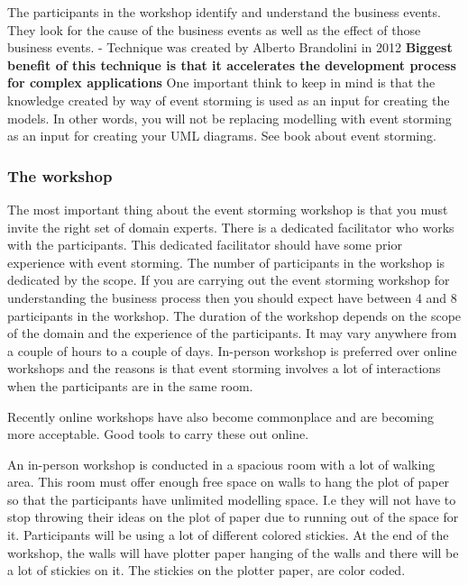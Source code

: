 \documentclass[a4paper, 11pt]{book}
\begin{document}
    The participants in the workshop identify and understand the business events.
    They look for the cause of the business events as well as the effect of those business events.
    - Technique was created by Alberto Brandolini in 2012 %
    \textbf{Biggest benefit of this technique is that it accelerates the development process for complex applications}
    One important think to keep in mind is that the knowledge created by way of event storming is used as an input for creating the models.
    In other words, you will not be replacing modelling with event storming as an input for creating your UML diagrams. See book about event storming.

    \subsubsection{The workshop}
    The most important thing about the event storming workshop is that you must invite the right set of domain experts.
    There is a dedicated facilitator who works with the participants.
    This dedicated facilitator should have some prior experience with event storming.
    The number of participants in the workshop is dedicated by the scope.
    If you are carrying out the event storming workshop for understanding the business process then you should expect have between 4 and 8 participants in the workshop.
    The duration of the workshop depends on the scope of the domain and the experience of the participants.
    It may vary anywhere from a couple of hours to a couple of days.
    In-person workshop is preferred over online workshops and the reasons is that event storming involves a lot of interactions when the participants are in the same room.

    Recently online workshops have also become commonplace and are becoming more acceptable.
    Good tools to carry these out online.

    An in-person workshop is conducted in a spacious room with a lot of walking area.
    This room must offer enough free space on walls to hang the plot of paper so that the participants have unlimited modelling space.
    I.e they will not have to stop throwing their ideas on the plot of paper due to running out of the space for it.
    Participants will be using a lot of different colored stickies.
    At the end of the workshop, the walls will have plotter paper hanging of the walls and there will be a lot of stickies on it.
    The stickies on the plotter paper, are color coded.
\end{document}
